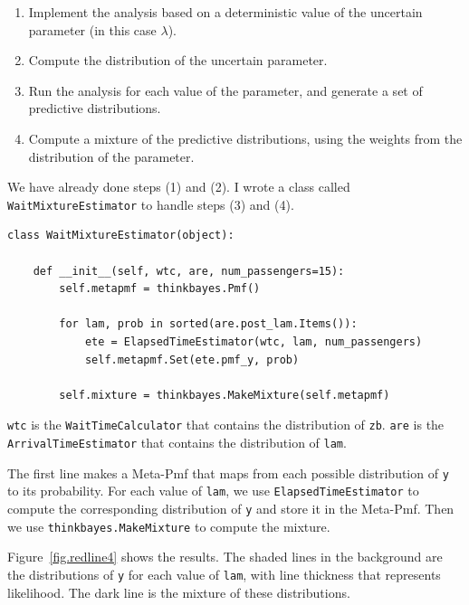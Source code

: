 \documentclass[12pt]{book}
\begin{document}
\begin{enumerate}

\item Implement the analysis based on a deterministic value of the
  uncertain parameter (in this case $\lambda$).

\item Compute the distribution of the uncertain parameter.

\item Run the analysis for each value of the parameter, and generate a
  set of predictive distributions.

\item Compute a mixture of the predictive distributions, using the
  weights from the distribution of the parameter.

\end{enumerate}

We have already done steps (1) and (2).  I wrote a class
called {\tt WaitMixtureEstimator} to handle steps (3) and (4).

\begin{verbatim}
class WaitMixtureEstimator(object):

    def __init__(self, wtc, are, num_passengers=15):
        self.metapmf = thinkbayes.Pmf()

        for lam, prob in sorted(are.post_lam.Items()):
            ete = ElapsedTimeEstimator(wtc, lam, num_passengers)
            self.metapmf.Set(ete.pmf_y, prob)

        self.mixture = thinkbayes.MakeMixture(self.metapmf)
\end{verbatim}

{\tt wtc} is the {\tt WaitTimeCalculator} that contains the
distribution of {\tt zb}.  {\tt are} is the {\tt ArrivalTimeEstimator}
that contains the distribution of {\tt lam}.

The first line makes a Meta-Pmf that maps from each possible
distribution of {\tt y} to its probability.  For each value
of {\tt lam}, we use {\tt ElapsedTimeEstimator} to
compute the corresponding distribution of
{\tt y} and store it in the Meta-Pmf.  Then
we use {\tt thinkbayes.MakeMixture} to compute the mixture.


Figure~\ref{fig.redline4} shows the results.  The shaded lines
in the background are the distributions of {\tt y} for each value
of {\tt lam}, with line thickness that represents likelihood.
The dark line is the mixture of these distributions.
\end{document}
